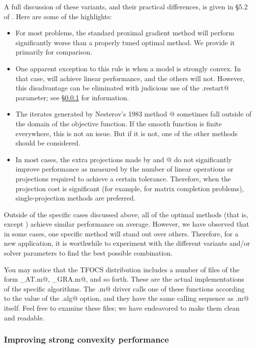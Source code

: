 \documentclass{article}
\begin{document}
A full discussion of these variants, and their practical differences, is
given in \S5.2 of \cite{TFOCS}. Here are some of the highlights:
\begin{itemize}
\item For most problems, the standard proximal gradient method 
\verb@GRA@ will perform significantly worse than a properly
tuned optimal method. We provide it primarily for comparison.
\item One apparent exception to this rule is when a model is
strongly convex. In that case, \verb@GRA@ will achieve
linear performance, and the others will not. However, this disadvantage
can be eliminated with judicious use of the \verb@opts.restart@
parameter; see \S\ref{sec:restart} for information.
\item The iterates generated by Nesterov's 1983 method @ sometimes
fall outside of the domain of the objective function. If the smooth function is
finite everywhere, this is not an issue. But if it is not, one of the other
methods should be considered.
\item In most cases, the extra projections made by
\verb@LLM@ and @
do not significantly improve performance as measured by the number of linear
operations or projections required to achieve a certain tolerance. Therefore,
when the projection cost is significant (for example, for matrix completion
problems), single-projection methods are preferred.
\end{itemize}
Outside of the specific cases discussed above, all of the optimal
methods (that is, except \verb@GRA@)
achieve similar performance on average.
However, we have observed that in some cases, one specific
method will stand out over others.
Therefore, for a new application, it is worthwhile to experiment with
the different variants and/or solver parameters to find the best
possible combination.

You may notice that the TFOCS distribution includes a number of
files of the form \verb@tfocs_AT.m@, \verb@tfocs_GRA.m@, and so forth.
These are the actual implementations of the specific algorithms.
The \verb@tfocs.m@ driver calls one of these functions
according to the value of the \verb@opts.alg@ option, and they have
the same calling sequence as \verb@tfocs.m@ itself. Feel free to
examine these files; we have endeavored to make them clean and readable.

\subsubsection{Improving strong convexity performance}
\label{sec:restart}
\end{document}
